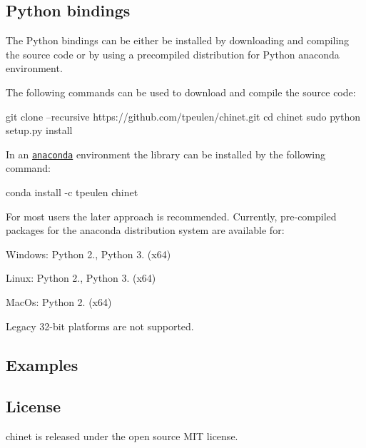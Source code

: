 \subsection*{Python bindings}

The Python bindings can be either be installed by downloading and compiling the source code or by using a precompiled distribution for Python anaconda environment.

The following commands can be used to download and compile the source code\+:


\begin{DoxyCode}
git clone --recursive https://github.com/tpeulen/chinet.git
cd chinet
sudo python setup.py install
\end{DoxyCode}


In an \href{https://www.anaconda.com/}{\tt anaconda} environment the library can be installed by the following command\+: 
\begin{DoxyCode}
conda install -c tpeulen chinet
\end{DoxyCode}


For most users the later approach is recommended. Currently, pre-\/compiled packages for the anaconda distribution system are available for\+:


\begin{DoxyItemize}
\item Windows\+: Python 2., Python 3. (x64)
\item Linux\+: Python 2., Python 3. (x64)
\item Mac\+Os\+: Python 2. (x64)
\end{DoxyItemize}

Legacy 32-\/bit platforms are not supported.

\subsection*{Examples}


\begin{DoxyCode}
\end{DoxyCode}


\subsection*{License}

chinet is released under the open source M\+IT license. 